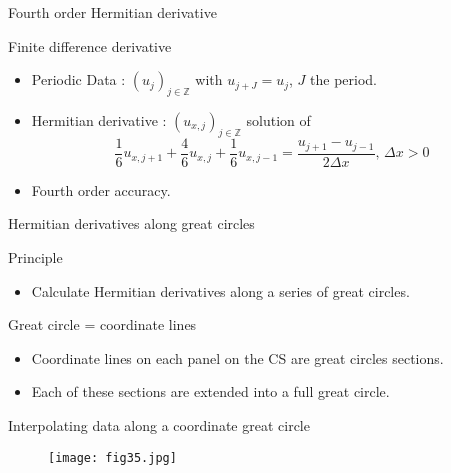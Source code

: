 \documentclass[11pt]{beamer}
\begin{document}

\begin{frame}{Fourth order Hermitian derivative}
\begin{block}{Finite difference derivative}
\begin{itemize}
\item Periodic Data : $(u_j)_{j \in \mathbb{Z}}$ with $u_{j+J}=u_j$, $J$ the period.

\item Hermitian derivative : $(u_{x,j})_{j \in \mathbb{Z}}$ solution of 
$$
\dfrac{1}{6}u_{x,j+1}+\dfrac{4}{6}u_{x,j}+\dfrac{1}{6}u_{x,j-1}=\dfrac{u_{j+1}-u_{j-1}}{2 \Delta x} \text{, } \Delta x > 0
$$ 

\item Fourth order accuracy.
\end{itemize}
\end{block}
\end{frame}


\begin{frame}{Hermitian derivatives along great circles}
\begin{block}{Principle}
\begin{itemize}
\item Calculate Hermitian derivatives along a series of great circles.  
\end{itemize}
\end{block}

\begin{block}{Great circle = coordinate lines}
\begin{itemize}
\item Coordinate lines on each panel on the CS are great circles sections.
\item Each of these sections are extended into a full great circle.
\end{itemize}
\end{block}
\end{frame}


\begin{frame}{Interpolating data along a coordinate great circle}
\begin{figure}
\texttt{[image: fig35.jpg]}
\end{figure}
\end{frame}
\end{document}
